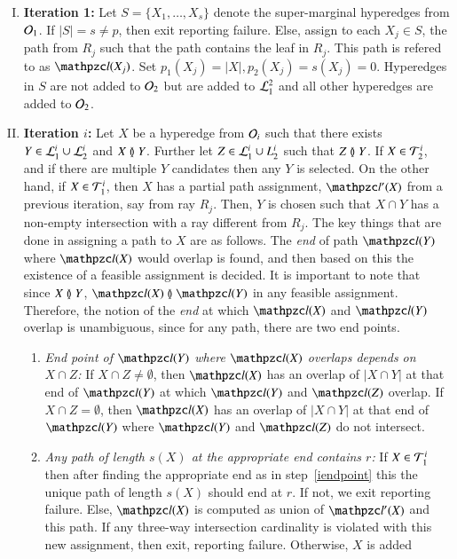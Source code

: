 \documentclass[MS,synopsis]{iitmdiss}
\begin{document}
\begin{enumerate}[I.]
\item {\bf Iteration 1:} Let $S=\{X_1,\ldots,X_s\}$ denote the
  super-marginal hyperedges from ${\cal O}_1$.  If $|S|=s \neq p$, then
  exit reporting failure.  Else, assign to each $X_j \in S$, the path
  from $R_j$ such that the path contains the leaf in $R_j$.  This path
  is refered to as $\cl(X_j)$.  Set $p_1(X_j)=|X|, p_2(X_j)=s(X_j)=0$.
  Hyperedges in $S$ are not added to ${\cal O}_2$ but are added to
  ${\cal L}_1^2$ and all other hyperedges are added to
  ${\cal O}_2$.
\item {\bf Iteration $i$:} Let $X$ be a hyperedge from ${\cal O}_i$ such
  that there exists $Y \in {\cal L}_1^i \cup {\cal L}_2^i$ and $X \between
  Y$. Further let $Z \in {\cal L}_1^i \cup L_2^i$ such that $Z \between Y$.
  If $X \in {\cal T}_2^i$, and if there are multiple $Y$ candidates then
  any $Y$ is selected.  On the other hand, if $X \in {\cal T}_1^i$, then
  $X$ has a partial path assignment, $\cl'(X)$ from a previous
  iteration, say from ray $R_j$. Then, $Y$ is
  chosen such that $X \cap Y$ has a non-empty intersection with a ray
  different from $R_j$.  The key things that are done in assigning a
  path to $X$ are as follows. The {\em end} of path $\cl(Y)$ where
  $\cl(X)$ would overlap is found, and then based on this the
  existence of a feasible assignment is decided.  It is important to
  note that since $X \between Y$, $\cl(X) \overlap \cl(Y)$ in any
  feasible assignment.  Therefore, the notion of the {\em end} at
  which $\cl(X)$ and $\cl(Y)$ overlap is unambiguous, since for any
  path, there are two end points.
  \begin{enumerate}
  \item \label{iendpoint} {\em End point of $\cl(Y)$ where $\cl(X)$ overlaps
      depends on $X \cap Z$:} If $X \cap Z
    \neq \emptyset$, then $\cl(X)$ has an overlap of $|X \cap Y|$ at that
    end of $\cl(Y)$ at which $\cl(Y)$ and $\cl(Z)$ overlap.  If $X
    \cap Z = \emptyset$, then $\cl(X)$ has an overlap of $|X \cap Y|$ at
    that end of $\cl(Y)$ where $\cl(Y)$ and $\cl(Z)$ do not intersect.
  \item {\em Any path of length $s(X)$ at the appropriate end contains
      $r$:} If $X \in {\cal T}_1^i$ then after finding the appropriate end
    as in step~\ref{iendpoint} this the unique path of length $s(X)$
    should end at $r$.  If not, we exit reporting failure.  Else,
    $\cl(X)$ is computed as union of $\cl'(X)$ and this path. If any
    three-way intersection cardinality is violated with this new
    assignment, then exit, reporting failure.  Otherwise, $X$ is added

\end{enumerate}
\end{enumerate}
\end{document}
